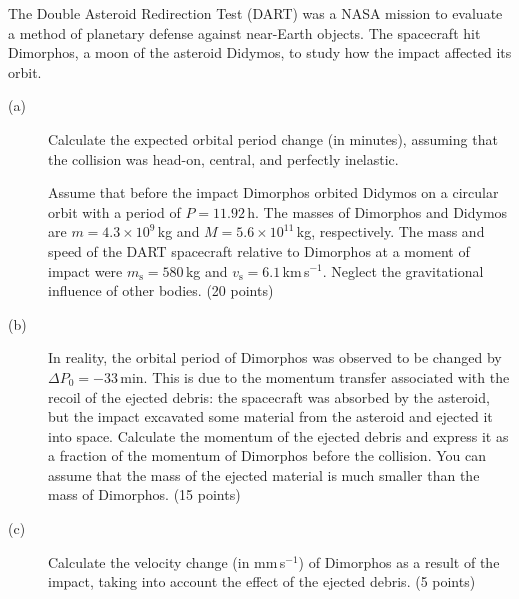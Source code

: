 The Double Asteroid Redirection Test (DART) was a NASA mission to evaluate a
method of planetary defense against near-Earth objects. The spacecraft hit
Dimorphos, a moon of the asteroid Didymos, to study how the impact affected
its orbit.

\begin{description}
\item[(a)] Calculate the expected orbital period change (in minutes), assuming
  that the collision was head-on, central, and perfectly inelastic.

  Assume that before the impact Dimorphos orbited Didymos on a circular orbit
  with a period of $P = 11.92$\,h. The masses of Dimorphos and Didymos are
  $m = 4.3 \times 10^9$\,kg and $M = 5.6 \times 10^{11}$\,kg, respectively.
  The mass and speed of the DART spacecraft relative to Dimorphos at a moment
  of impact were $m_{\mathrm{s}} = 580$\,kg and
  $v_{\mathrm{s}} = 6.1$\,km\,s$^{-1}$. Neglect the gravitational influence of
  other bodies. \hfill(20 points)
\item[(b)] In reality, the orbital period of Dimorphos was observed to be
  changed by $\Delta P_0 = -33$\,min. This is due to the momentum transfer
  associated with the recoil of the ejected debris: the spacecraft was
  absorbed by the asteroid, but the impact excavated some material from the
  asteroid and ejected it into space. Calculate the momentum of the ejected
  debris and express it as a fraction of the momentum of Dimorphos before the
  collision. You can assume that the mass of the ejected material is much
  smaller than the mass of Dimorphos. \hfill(15 points)
\item[(c)] Calculate the velocity change (in mm\,s$^{-1}$) of Dimorphos as a
  result of the impact, taking into account the effect of the ejected debris.
  \hfill(5 points)
\end{description}
